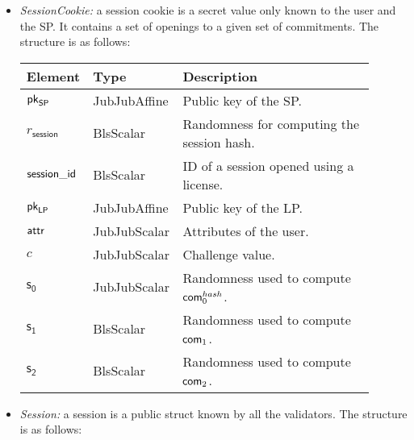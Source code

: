 \begin{itemize}
	\item \emph{SessionCookie:} a session cookie is a secret value only known to the user and the SP. It contains a set of openings to a given set of commitments. The structure is as follows:
	
	
		
	\vspace{0.1cm}
	\begin{center}
		\begin{tabular}{ | p{0.15\linewidth} | p{0.2\linewidth} | p{0.55\linewidth} | } 
			\hline
			{Element} & {Type} & {Description} \\
			\hline
			$\mathsf{pk}_{\mathsf{SP}}$ & JubJubAffine & Public key of the SP. \\
			$r_\mathsf{session}$ & BlsScalar & Randomness for computing the session hash. \\
			$\mathsf{session\_id}$ & BlsScalar & ID of a session opened using a license. \\ 
			$\mathsf{pk}_{\mathsf{LP}}$ & JubJubAffine & Public key of the LP. \\ 
			$\mathsf{attr}$ & JubJubScalar & Attributes of the user. \\ 
			$c$ & JubJubScalar & Challenge value. \\ 
			$\mathsf{s_0}$ & JubJubScalar & Randomness used to compute $\mathsf{com}_0^{hash}$. \\
			$\mathsf{s_1}$ & BlsScalar & Randomness used to compute $\mathsf{com}_1$. \\
			$\mathsf{s_2}$ & BlsScalar & Randomness used to compute $\mathsf{com}_2$. \\
			\hline
		\end{tabular}
	\end{center}	

	\item \emph{Session:} a session is a public struct known by all the validators. The structure is as follows:
	

	
	

\end{itemize}
